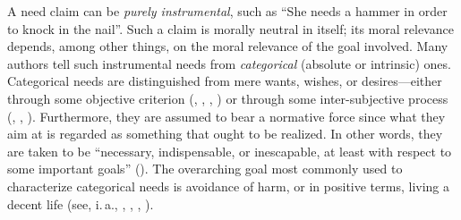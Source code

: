 \documentclass[egregdoesnotlikesansseriftitles]{scrartcl}
\begin{document}
A need claim can be \textit{purely instrumental}, such as ``She needs a hammer in order to knock in the nail''.
Such a claim is morally neutral in itself; its moral relevance depends, among other things, on the moral relevance of the goal involved.
Many authors tell such instrumental needs from \textit{categorical} (absolute or intrinsic) ones.
Categorical needs are distinguished from mere wants, wishes, or desires---either through some objective criterion (\citealt{brock_needs_2005}, \citealt{thomson_fundamental_2005}, \citealt{weale_needs_1998}, \citealt{wringe_needs_2005}) or through some inter-subjective process (\citealt{kelsen_was_2016}, \citealt{hamilton_political_2003}, \citealt{miller_principles_1999}). 
Furthermore, they are assumed to bear a normative force since what they aim at is regarded as something that ought to be realized.
In other words, they are taken to be ``necessary, indispensable, or inescapable, at least with respect to some important goals'' (\citealt[par. 37]{brock_needs_2019}).
The overarching goal most commonly used to characterize categorical needs is avoidance of harm, or in positive terms, living a decent life (see, i.\,a., \citealt{frankfurt_necessity_1984}, \citealt{miller_social_1976,miller_principles_1999}, \citealt{thomson_need_1987,thomson_fundamental_2005}, \citealt{wiggins_needs_1987,wiggins_what_1998}).
\end{document}
